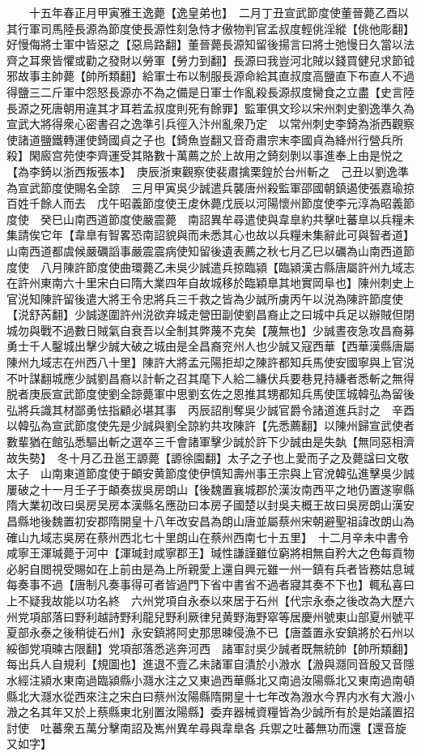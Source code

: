 　　十五年春正月甲寅雅王逸薨【逸皇弟也】　二月丁丑宣武節度使董晉薨乙酉以其行軍司馬陸長源為節度使長源性刻急恃才傲物判官孟叔度輕佻淫縱【佻他彫翻】好慢侮將士軍中皆惡之【惡烏路翻】董晉薨長源知留後揚言曰將士弛慢日久當以法齊之耳衆皆懼或勸之發財以勞軍【勞力到翻】長源曰我豈河北賊以錢買健兒求節钺邪故事主帥薨【帥所類翻】給軍士布以制服長源命給其直叔度高鹽直下布直人不過得鹽三二斤軍中怨怒長源亦不為之備是日軍士作亂殺長源叔度臠食之立盡【史言陸長源之死唐朝用違其才耳若孟叔度則死有餘罪】監軍俱文珍以宋州刺史劉逸準久為宣武大將得衆心密書召之逸準引兵徑入汴州亂衆乃定　以常州刺史李錡為浙西觀察使諸道鹽鐵轉運使錡國貞之子也【錡魚豈翻又音奇肅宗末李國貞為絳州行營兵所殺】閑廄宫苑使李齊運受其賂數十萬薦之於上故用之錡刻剝以事進奉上由是悦之【為李錡以浙西叛張本】　庚辰浙東觀察使裴肅擒栗鍠於台州斬之　己丑以劉逸準為宣武節度使賜名全諒　三月甲寅吳少誠遣兵襲唐州殺監軍邵國朝鎮遏使張嘉瑜掠百姓千餘人而去　戊午昭義節度使王䖍休薨戊辰以河陽懷州節度使李元淳為昭義節度使　癸巳山南西道節度使嚴震薨　南詔異牟尋遣使與韋臯約共擊吐蕃臯以兵糧未集請俟它年【韋臯有智畧恐南詔貌與而未悉其心也故以兵糧未集辭此可與智者道】　山南西道都虞候嚴礪謟事嚴震震病使知留後遺表薦之秋七月乙巳以礪為山南西道節度使　八月陳許節度使曲環薨乙未吳少誠遣兵掠臨潁【臨潁漢古縣唐屬許州九域志在許州東南六十里宋白曰隋大業四年自故城移於臨穎臯其地實岡阜也】陳州刺史上官涚知陳許留後遣大將王令忠將兵三千救之皆為少誠所虜丙午以涚為陳許節度使【涚舒芮翻】少誠遂圍許州涚欲弃城走營田副使劉昌裔止之曰城中兵足以辦賊但閉城勿與戰不過數日賊氣自衰吾以全制其弊蔑不克矣【蔑無也】少誠晝夜急攻昌裔募勇士千人鑿城出擊少誠大破之城由是全昌裔兖州人也少誠又寇西華【西華漢縣唐屬陳州九域志在州西八十里】陳許大將孟元陽拒却之陳許都知兵馬使安國寧與上官涚不叶謀翻城應少誠劉昌裔以計斬之召其麾下人給二縑伏兵要巷見持縑者悉斬之無得脱者庚辰宣武節度使劉全諒薨軍中思劉玄佐之恩推其甥都知兵馬使匡城韓弘為留後弘將兵識其材鄙勇怯指顧必堪其事　丙辰詔削奪吳少誠官爵令諸道進兵討之　辛酉以韓弘為宣武節度使先是少誠與劉全諒約共攻陳許【先悉薦翻】以陳州歸宣武使者數輩猶在館弘悉驅出斬之選卒三千會諸軍擊少誠於許下少誠由是失埶【無同惡相濟故失勢】　冬十月乙丑邕王謜薨【謜徐園翻】太子之子也上愛而子之及薨諡曰文敬太子　山南東道節度使于頔安黄節度使伊慎知壽州事王宗與上官涗韓弘進擊吳少誠屢破之十一月壬子于頔奏拔吳房朗山【後魏置襄城郡於漢汝南西平之地仍置遂寧縣隋大業初改曰吳房吴房本漢縣名應劭曰本房子國楚以封吳夫概王故曰吳房朗山漢安昌縣地後魏置初安郡隋開皇十八年改安昌為朗山唐並屬蔡州宋朝避聖祖諱改朗山為確山九域志吳房在蔡州西北七十里朗山在蔡州西南七十五里】　十二月辛未中書令咸寧王渾瑊薨于河中【渾瑊封咸寧郡王】瑊性謙謹雖位窮將相無自矜大之色每貢物必躬自閲視受賜如在上前由是為上所親愛上還自興元雖一州一鎮有兵者皆務姑息瑊每奏事不過【唐制凡奏事得可者皆過門下省中書省不過者寢其奏不下也】輒私喜曰上不疑我故能以功名終　六州党項自永泰以來居于石州【代宗永泰之後改為大歷六州党項部落曰野利越詩野利龍兒野利厥律兒黄野海野窣等居慶州號東山部夏州號平夏部永泰之後稍徙石州】永安鎮將阿史那思暕侵漁不已【唐蓋置永安鎮將於石州以綏御党項暕古限翻】党項部落悉逃奔河西　諸軍討吳少誠者既無統帥【帥所類翻】每出兵人自規利【規圖也】進退不壹乙未諸軍自潰於小溵水【溵與㶏同音殷又音隱水經注潁水東南過臨潁縣小㶏水注之又東過西華縣北又南過汝陽縣北又東南過南頓縣北大㶏水從西來注之宋白曰蔡州汝陽縣隋開皇十七年改為溵水今界内水有大溵小溵之名其年又於上蔡縣東北别置汝陽縣】委弃器械資糧皆為少誠所有於是始議置招討使　吐蕃衆五萬分擊南詔及嶲州異牟尋與韋臯各兵禦之吐蕃無功而還【還音旋又如字】

